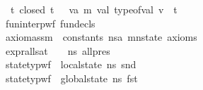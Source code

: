 \begin{isabellebody}
\ \ \ \ \ \ \ \ \ \ \ {\isacharparenleft}{\kern0pt}{\isasymAnd}\ t{\isachardot}{\kern0pt}\ {\isacharparenleft}{\kern0pt}{\isacharparenleft}{\kern0pt}closed\ t{\isacharparenright}{\kern0pt}\ {\isasymLongrightarrow}\ {\isacharparenleft}{\kern0pt}{\isasymexists}\ v{\isacharcolon}{\kern0pt}{\isacharcolon}{\kern0pt}{\isacharparenleft}{\kern0pt}{\isacharprime}{\kern0pt}a{\isacharcomma}{\kern0pt}\ {\isacharprime}{\kern0pt}m{\isacharparenright}{\kern0pt}\ val{\isachardot}{\kern0pt}\ {\isacharparenleft}{\kern0pt}{\isacharparenleft}{\kern0pt}{\isacharparenleft}{\kern0pt}type{\isacharunderscore}{\kern0pt}of{\isacharunderscore}{\kern0pt}val{\isacharparenright}{\kern0pt}\ v{\isacharparenright}{\kern0pt}\ {\isacharequal}{\kern0pt}\ t{\isacharparenright}{\kern0pt}{\isacharparenright}{\kern0pt}{\isacharparenright}{\kern0pt}{\isacharparenright}{\kern0pt}\ {\isasymLongrightarrow}\isanewline
\ \ \ \ \ \ \ \ \ \ \ {\isacharparenleft}{\kern0pt}fun{\isacharunderscore}{\kern0pt}interp{\isacharunderscore}{\kern0pt}wf\ fun{\isacharunderscore}{\kern0pt}decls\ {\isasymGamma}{\isacharparenright}{\kern0pt}\ {\isasymLongrightarrow}\isanewline
\ \ \ \ \ \ \ \ \ \ \ {\isacharparenleft}{\kern0pt}axiom{\isacharunderscore}{\kern0pt}assm\ {\isasymGamma}\ constants\ {\isacharparenleft}{\kern0pt}ns{\isacharcolon}{\kern0pt}{\isacharcolon}{\kern0pt}{\isacharparenleft}{\kern0pt}{\isacharparenleft}{\kern0pt}{\isacharprime}{\kern0pt}a{\isacharcomma}{\kern0pt}\ {\isacharprime}{\kern0pt}m{\isacharparenright}{\kern0pt}nstate{\isacharparenright}{\kern0pt}{\isacharparenright}{\kern0pt}\ axioms{\isacharparenright}{\kern0pt}\ {\isasymLongrightarrow}\isanewline
\ \ \ \ \ \ \ \ \ \ \ {\isacharparenleft}{\kern0pt}expr{\isacharunderscore}{\kern0pt}all{\isacharunderscore}{\kern0pt}sat\ {\isasymLambda}\ {\isasymGamma}\ {\isacharbrackleft}{\kern0pt}{\isacharbrackright}{\kern0pt}\ ns\ all{\isacharunderscore}{\kern0pt}pres{\isacharparenright}{\kern0pt}\ {\isasymLongrightarrow}\isanewline
\ \ \ \ \ \ \ \ \ \ \ {\isacharparenleft}{\kern0pt}state{\isacharunderscore}{\kern0pt}typ{\isacharunderscore}{\kern0pt}wf\ {\isacharbrackleft}{\kern0pt}{\isacharbrackright}{\kern0pt}\ {\isacharparenleft}{\kern0pt}local{\isacharunderscore}{\kern0pt}state\ ns{\isacharparenright}{\kern0pt}\ {\isacharparenleft}{\kern0pt}snd\ {\isasymLambda}{\isacharparenright}{\kern0pt}{\isacharparenright}{\kern0pt}\ {\isasymLongrightarrow}\isanewline
\ \ \ \ \ \ \ \ \ \ \ {\isacharparenleft}{\kern0pt}state{\isacharunderscore}{\kern0pt}typ{\isacharunderscore}{\kern0pt}wf\ {\isacharbrackleft}{\kern0pt}{\isacharbrackright}{\kern0pt}\ {\isacharparenleft}{\kern0pt}global{\isacharunderscore}{\kern0pt}state\ ns{\isacharparenright}{\kern0pt}\ {\isacharparenleft}{\kern0pt}fst\ {\isasymLambda}{\isacharparenright}{\kern0pt}{\isacharparenright}{\kern0pt}\ {\isasymLongrightarrow}\isanewline

\end{isabellebody}
